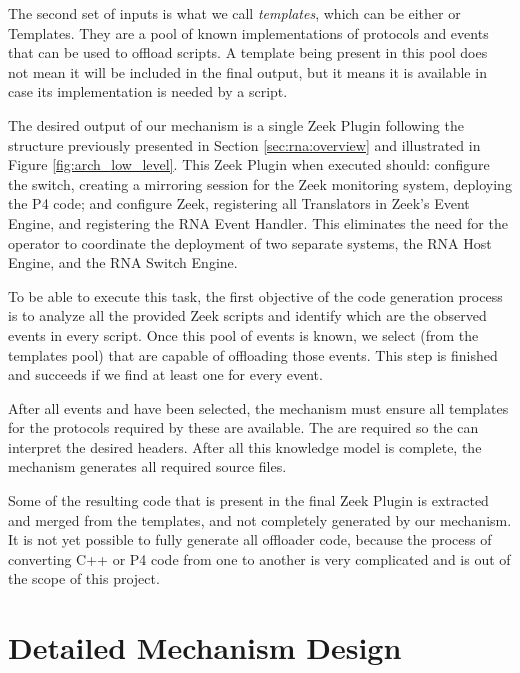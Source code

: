 The second set of inputs is what we call \textit{templates}, which can be either  \ProtocolTemplates{} or \Offloader{} Templates. They are a pool of known implementations of protocols and events that can be used to offload scripts. A template being present in this pool does not mean it will be included in the final output, but it means it is available in case its implementation is needed by a script.

The desired output of our mechanism is a single Zeek Plugin following the structure previously presented in Section \ref{sec:rna:overview} and illustrated in Figure \ref{fig:arch_low_level}. This Zeek Plugin when executed should: configure the switch, creating a mirroring session for the Zeek monitoring system, deploying the P4 code; and configure Zeek, registering all Translators in Zeek's Event Engine, and registering the RNA Event Handler. This eliminates the need for the operator to coordinate the deployment of two separate systems, the RNA Host Engine, and the RNA Switch Engine.

To be able to execute this task, the first objective of the code generation process is to analyze all the provided Zeek scripts and identify which are the observed events in every script. Once this pool of events is known, we select \Offloaders{} (from the templates pool) that are capable of offloading those events. This step is finished and succeeds if we find at least one \Offloader{} for every event.

After all events and \Offloaders{} have been selected, the mechanism must ensure all templates for the protocols required by these \Offloaders{} are available. The \ProtocolTemplates{} are required so the \Offloaders{} can interpret the desired headers. After all this knowledge model is complete, the mechanism generates all required source files.

Some of the resulting code that is present in the final Zeek Plugin is extracted and merged from the templates, and not completely generated by our mechanism. It is not yet possible to fully generate all offloader code, because the process of converting C++ or P4 code from one to another is very complicated and is out of the scope of this project.


% 
% 

\section{Detailed Mechanism Design}
\label{sec:code_gen_impl}

